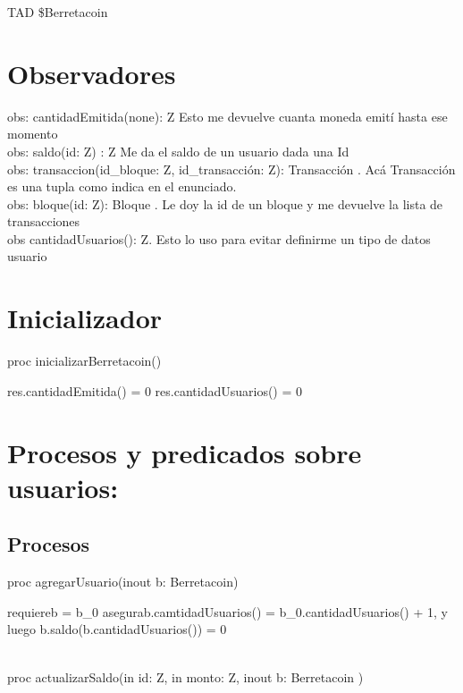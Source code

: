 \documentclass[10pt,a4paper]{article}
\begin{document}
\maketitle

TAD \$Berretacoin  {


\section{Observadores}
obs: cantidadEmitida(none): Z Esto me devuelve cuanta moneda emití hasta ese momento \\

obs: saldo(id: Z) : Z Me da el saldo de un usuario dada una Id\\

obs: transaccion(id_bloque: Z, id_transacción: Z): Transacción . Acá Transacción es una tupla como indica en el enunciado.\\

obs: bloque(id: Z): Bloque . Le doy la id de un bloque y me devuelve la lista de transacciones\\

obs cantidadUsuarios(): Z. Esto lo uso para evitar definirme un tipo de datos usuario \\

\section{Inicializador}

proc inicializarBerretacoin(){

    res.cantidadEmitida() = 0
    res.cantidadUsuarios() = 0


}

\section{Procesos y predicados sobre usuarios: }

\subsection{Procesos}

proc agregarUsuario(inout b: Berretacoin){

    requiere{b = b_0}
    asegura{b.camtidadUsuarios() = b_0.cantidadUsuarios() + 1, y luego b.saldo(b.cantidadUsuarios()) = 0 }
} \\


proc actualizarSaldo(in id: Z, in monto: Z, inout b: Berretacoin ){

}}
\end{document}
